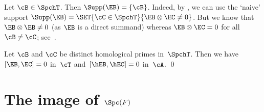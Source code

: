 \begin{Exa}
\label{Exa:Supp(EB)}
Let $\cB\in\SpchT$. Then $\Supp(\EB)=\{\cB\}$. Indeed, by , we can use the `naive' support $\Supp(\EB)=\SET{\cC\in\SpchT}{\EB\otimes\EC\neq 0}$. But we know that $\EB\otimes\EB\neq 0$ (as $\EB$ is a direct summand) whereas $\EB\otimes\EC=0$ for all~$\cB\neq\cC$; see~\cite[Prop.\,5.3]{Balmer20a}.
\end{Exa}

\begin{Cor}
\label{Cor:[EB,EC]}
Let $\cB$ and $\cC$ be distinct homological primes in~$\SpchT$. Then we have $[\EB,\EC]=0$ in~$\cT$ and~$[\hEB,\hEC]=0$ in~$\cA$.
\qed
\end{Cor}

\section{The image of \texorpdfstring{$\Spc(F)$}{Spc}}
\label{sec:im(Spc(F))}

